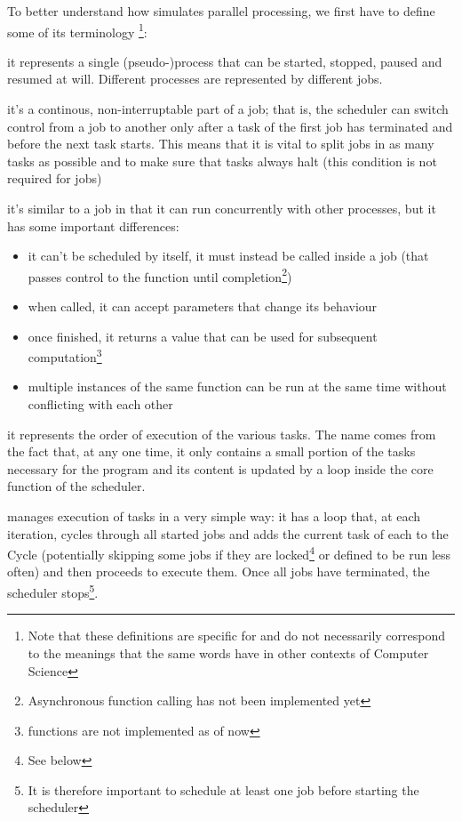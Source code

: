   \beforelist* To better understand how \ScheMo{} simulates parallel processing,
  we first have to define some of its terminology%
  \footnote{Note that these definitions are specific for \ScheMo{} and
  do not necessarily correspond to the meanings that the same words
  have in other contexts of Computer Science}:
  \begin{description}[align=right]
    \item [Job] it represents a single (pseudo-)process that can be
      started, stopped, paused and resumed at will. Different
      processes are represented by different jobs.
    \item [Task] it's a continous, non-interruptable part of a job;
      that is, the scheduler can switch control from a job to
      another only after a task of the first job has terminated and
      before the next task starts. This means that it is vital to
      split jobs in as many tasks as possible and to make sure that
      tasks always halt (this condition is not required for jobs)
    \item [Function] it's similar to a job in that it can run
      concurrently with other processes, but it has some important
      differences:
      \begin{itemize}
        \item it can't be scheduled by itself, it must instead be
          called inside a job (that passes control to the function
          until completion\footnote{Asynchronous function calling
          has not been implemented yet})
        \item when called, it can accept parameters that change its
          behaviour
        \item once finished, it returns a value that can be used for
          subsequent computation\footnote{ functions are
          not implemented as of now}
        \item multiple instances of the same function can be run at
          the same time without conflicting with each other
      \end{itemize}
    \item [Cycle] it represents the order of execution of the
      various tasks. The name comes from the fact that, at any one
      time, it only contains a small portion of the tasks necessary
      for the program and its content is updated by a loop inside
      the core function of the scheduler.
  \end{description}
  \afterlist*
  \ScheMo{} manages execution of tasks in a very simple way: it has a
  loop that, at each iteration, cycles through all started jobs and
  adds the current task of each to the Cycle (potentially skipping
  some jobs if they are locked\footnote{See below} or defined to be
  run less often) and then proceeds to execute them. Once all jobs
  have terminated, the scheduler stops\footnote{It is therefore
  important to schedule at least one job before starting the
  scheduler}.

